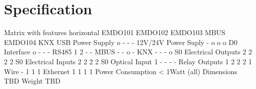 \documentclass[11pt,fleqn]{book} %
\numberwithin{equation}{section} %
\numberwithin{figure}{section} %
\numberwithin{table}{section} %
\begin{document}

\chapter{Specification}
Matrix with features
horizontal	EMDO101	EMDO102	EMDO103 MBUS	EMDO104 KNX
USB Power Supply o - - -
12V/24V Power Suply - o o o
D0 Interface o - - -
RS485 1 2 - -
MBUS - - o -
KNX - - - o
S0 Electrical Outputs 2 2 2 2 
S0 Electrical Inputs 2 2 2 2
S0 Optical Input 1 - - - -
Relay Outputs 1 2 2 2
1 Wire - 1 1 1 
Ethernet 1 1 1 1
Power Consumption < 1Watt (all)
Dimensions TBD
Weight TBD
\end{document}
